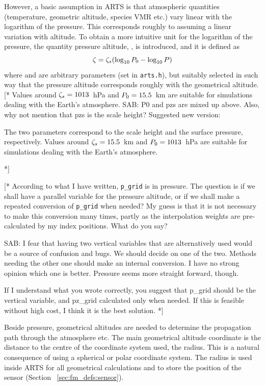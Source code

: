 However, a basic assumption in ARTS is that atmospheric quantities
(temperature, geometric altitude, species VMR etc.) vary linear with
the logarithm of the pressure. This corresponds roughly to assuming a
linear variation with altitude. To obtain a more intuitive unit for the
logarithm of the pressure, the quantity pressure altitude, \PrsAlt, is
introduced, and it is defined as
\begin{equation}
  \zeta = \zeta_{s}(\log_{10}P_{0} - \log_{10}P)
 \label{eq:fm_defs:prsalt}
\end{equation}
where  and  are arbitrary parameters (set in
\verb|arts.h|), but suitably selected in such way that the pressure
altitude corresponds roughly with the geometrical altitude. [* Values
around $\zeta_{s}=1013$~hPa and $P_{0}=15.5$~km are suitable for
simulations dealing with the Earth's atmosphere. SAB: P0 and pzs are
mixed up above. Also, why not mention that pzs is the scale height?
Suggested new version:

The two parameters correspond to the scale height and the surface
pressure, respectively. Values around $\zeta_{s}=15.5$~km and
$P_{0}=1013$~hPa are suitable for simulations dealing with the
Earth's atmosphere.

*]

[* According to what I have written, \verb|p_grid| is in pressure.
The question is if we shall have a parallel variable for the pressure
altitude, or if we shall make a repeated conversion of \verb|p_grid|
when needed? My guess is that it is not necessary to make this
conversion many times, partly as the interpolation weights are
pre-calculated by my index positions. What do you say? 

SAB: I fear that having two vertical variables that are alternatively
used would be a source of confusion and bugs. We should decide on one
of the two. Methods needing the other one should make an internal
conversion. I have no strong opinion which one is better. Pressure
seems more straight forward, though.

If I understand what you wrote correctly, you suggest that p\_grid
should be the vertical variable, and pz\_grid calculated only when
needed. If this is feasible without high cost, I think it is the best
solution.  *]

 Beside pressure, geometrical altitudes
are needed to determine the propagation path through the atmosphere
etc. The main geometrical altitude coordinate is the distance to the
centre of the coordinate system used, the radius. This is a natural
consequence of using a spherical or polar coordinate system. The
radius is used inside ARTS for all geometrical calculations and to
store the position of the sensor (Section~ \ref{sec:fm_defs:sensor}).

